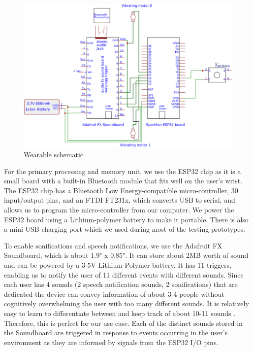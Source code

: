 \begin{figure}[htbp]
\centering
\begin{center}
\includegraphics[width=1\columnwidth]{figures/schematic.png}
\end{center}
\caption{Wearable schematic}
\label{fig:schematic}
\end{figure}

For the primary processing and memory unit, we use the ESP32 chip as it is a small board with a built-in Bluetooth module that fits well on the user's wrist. The ESP32 chip has a Bluetooth Low Energy-compatible micro-controller, 30 input/output pins, and an FTDI FT231x, which converts USB to serial, and allows us to program the micro-controller from our computer. We power the ESP32 board using a Lithium-polymer battery to make it portable. There is also a mini-USB charging port which we used during most of the testing prototypes. 
 
To enable sonifications and speech notifications, we use the Adafruit FX Soundboard, which is about 1.9" x 0.85". It can store about 2MB worth of sound and can be powered by a 3-5V Lithium-Polymer battery. It has 11 triggers, enabling us to notify the user of 11 different events with different sounds. Since each user has 4 sounds (2 speech notification sounds,  2 sonifications) that are dedicated the device can convey information of about 3-4 people without cognitively overwhelming the user with too many different sounds. It is relatively easy to learn to differentiate between and keep track of about 10-11 sounds \cite{Roder:2001aa,Kujala:1995aa,Abel:2004aa}. Therefore, this is perfect for our use case. Each of the distinct sounds stored in the Soundboard are triggered in response to events occurring in the user's environment as they are informed by signals from the ESP32 I/O pins. 
 
